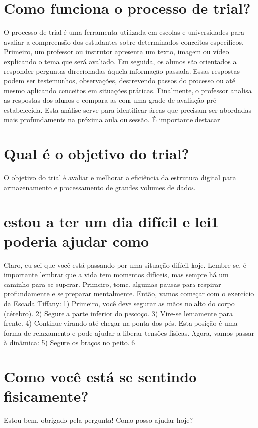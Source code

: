 \documentclass[11pt,a4paper]{article}
\begin{document}
\section{Como funciona o processo de trial?}
O processo de trial é uma ferramenta utilizada em escolas e universidades para avaliar a compreensão dos estudantes sobre determinados conceitos específicos. Primeiro, um professor ou instrutor apresenta um texto, imagem ou vídeo explicando o tema que será avaliado. Em seguida, os alunos são orientados a responder perguntas direcionadas àquela informação passada. Essas respostas podem ser testemunhos, observações, descrevendo passos do processo ou até mesmo aplicando conceitos em situações práticas. Finalmente, o professor analisa as respostas dos alunos e compara-as com uma grade de avaliação pré-estabelecida. Esta análise serve para identificar áreas que precisam ser abordadas mais profundamente na próxima aula ou sessão. É importante destacar

\section{Qual é o objetivo do trial?}
O objetivo do trial é avaliar e melhorar a eficiência da estrutura digital para armazenamento e processamento de grandes volumes de dados.

\section{estou a ter um dia difícil e lei1 poderia ajudar como}
Claro, eu sei que você está passando por uma situação difícil hoje. Lembre-se, é importante lembrar que a vida tem momentos difíceis, mas sempre há um caminho para se superar. Primeiro, tomei algumas pausas para respirar profundamente e se preparar mentalmente. Então, vamos começar com o exercício da Escada Tiffany: 1) Primeiro, você deve segurar as mãos no alto do corpo (cérebro). 2) Segure a parte inferior do pescoço. 3) Vire-se lentamente para frente. 4) Continue virando até chegar na ponta dos pés. Esta posição é uma forma de relaxamento e pode ajudar a liberar tensões físicas. Agora, vamos passar à dinâmica: 5) Segure os braços no peito. 6

\section{Como você está se sentindo fisicamente?}
Estou bem, obrigado pela pergunta! Como posso ajudar hoje?
\end{document}
